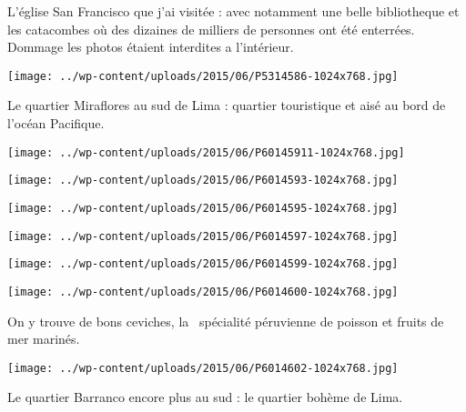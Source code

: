  \pagebreak

L'église San Francisco que j'ai visitée : avec notamment une belle bibliotheque et les catacombes où des dizaines de milliers de personnes ont été enterrées. Dommage les photos étaient interdites a l'intérieur. 

\begin{center} \texttt{[image: ../wp-content/uploads/2015/06/P5314586-1024x768.jpg]} \end{center}

Le quartier Miraflores au sud de Lima : quartier touristique et aisé au bord de l'océan Pacifique. 

\begin{center} \texttt{[image: ../wp-content/uploads/2015/06/P60145911-1024x768.jpg]} \end{center}

\begin{center} \texttt{[image: ../wp-content/uploads/2015/06/P6014593-1024x768.jpg]} \end{center}

\begin{center} \texttt{[image: ../wp-content/uploads/2015/06/P6014595-1024x768.jpg]} \end{center}

\begin{center} \texttt{[image: ../wp-content/uploads/2015/06/P6014597-1024x768.jpg]} \end{center}

\begin{center} \texttt{[image: ../wp-content/uploads/2015/06/P6014599-1024x768.jpg]} \end{center}

\begin{center} \texttt{[image: ../wp-content/uploads/2015/06/P6014600-1024x768.jpg]} \end{center}

On y trouve de bons ceviches, \og la \fg\ spécialité péruvienne de poisson et fruits de mer marinés. 

\begin{center} \texttt{[image: ../wp-content/uploads/2015/06/P6014602-1024x768.jpg]} \end{center}
 
\pagebreak

Le quartier Barranco encore plus au sud : le quartier bohème de Lima. 


